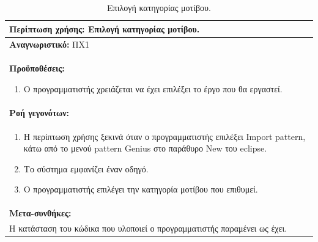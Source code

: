 \begin{table}[H]
	\hspace*{-0.2cm}
    \centering
    \scriptsize
	\begin{tabular}{|p{10cm}|}
		\hline
		\textbf{Περίπτωση χρήσης:} Επιλογή κατηγορίας μοτίβου.\\
		\hline
		\textbf{Αναγνωριστικό:} ΠΧ1\\
		\hline	
		\textbf{Προϋποθέσεις:}
		\begin{enumerate}
			\item Ο προγραμματιστής χρειάζεται να έχει επιλέξει το έργο που θα εργαστεί.
		\end{enumerate}\\
		\hline
		\textbf{Ροή γεγονότων:} \\ 
		\begin{enumerate}
			\item Η περίπτωση χρήσης ξεκινά όταν ο προγραμματιστής επιλέξει Import pattern, κάτω από το μενού pattern Genius στο παράθυρο New του eclipse. 
			\item Το σύστημα εμφανίζει έναν οδηγό.
			\item Ο προγραμματιστής επιλέγει την κατηγορία μοτίβου που επιθυμεί.
		\end{enumerate}\\
		\hline
		\textbf{Μετα-συνθήκες:} \\ Η κατάσταση του κώδικα που υλοποιεί ο προγραμματιστής παραμένει ως έχει. \\
		\hline
    \end{tabular}
    \caption{Επιλογή κατηγορίας μοτίβου.}
    \label{tab:selectPatternCategoryUC}
\end{table}
